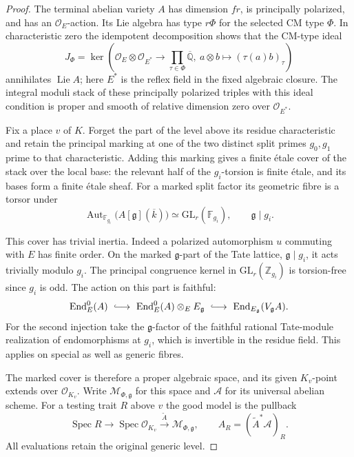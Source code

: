 \begin{proof}
The terminal abelian variety \(A\) has dimension \(fr\), is principally
polarized, and has an \(\mathcal O_E\)-action. Its Lie algebra has type
\(r\Phi\) for the selected CM type \(\Phi\). In characteristic zero
the idempotent decomposition shows that the CM-type ideal
\[
 J_\Phi=\ker\!\left(\mathcal O_E\otimes\mathcal O_{E^*}
    \longrightarrow \prod_{\tau\in\Phi}\overline{\mathbb Q},
              \ a\otimes b\longmapsto(\tau(a)b)_\tau\right)
\]
annihilates \(\operatorname{Lie}A\); here \(E^*\) is the reflex field
in the fixed algebraic closure. The integral moduli stack of these
principally polarized triples with this ideal condition is proper and
smooth of relative dimension zero over \(\mathcal O_{E^*}\).
\cite[Theorem~35]{amir-khosravi-serre}

Fix a place \(v\) of \(K\). Forget the part of the level above its residue
characteristic and retain the principal marking at one of the two
distinct split primes \(g_0,g_1\) prime to that characteristic.
Adding this marking gives a finite \'etale cover of the stack over the
local base: the relevant half of the \(g_i\)-torsion is finite \'etale,
and its bases form a finite \'etale sheaf. For a marked split factor its geometric fibre is a torsor under
\[
 \operatorname{Aut}_{\mathbb F_{g_i}}
     \bigl(A[\mathfrak g](\overline{k})\bigr)
           \simeq\mathrm{GL}_r(\mathbb F_{g_i}),\qquad \mathfrak g\mid g_i .
\]

This cover has trivial inertia. Indeed a polarized automorphism \(u\) commuting with \(E\) has finite
order. On the marked \(\mathfrak g\)-part of the Tate lattice,
\(\mathfrak g\mid g_i\), it acts trivially modulo \(g_i\).
The principal congruence kernel in \(\mathrm{GL}_r(\mathbb Z_{g_i})\)
is torsion-free since \(g_i\) is odd. The action on this part is faithful:
\[
 \operatorname{End}^0_{E}(A)\ \lhook\joinrel\longrightarrow\
 \operatorname{End}^0_{E}(A)\otimes_E E_{\mathfrak g}
 \ \lhook\joinrel\longrightarrow\
 \operatorname{End}_{E_{\mathfrak g}}(V_{\mathfrak g}A).
\]
For the second injection take the \(\mathfrak g\)-factor of the
faithful rational Tate-module realization of endomorphisms at
\(g_i\), which is invertible in the residue field.
This applies on special as well as generic fibres.

The marked cover is therefore a proper algebraic space, and its given
\(K_v\)-point extends over \(\mathcal O_{K_v}\). Write \(\mathcal M_{\Phi,\mathfrak g}\) for this space and \(\mathcal A\)
for its universal abelian scheme. For a testing trait \(R\) above \(v\)
the good model is the pullback
\[
  \operatorname{Spec} R\longrightarrow\operatorname{Spec}\mathcal O_{K_v}
      \xrightarrow{\,\widetilde A\,}\mathcal M_{\Phi,\mathfrak g},
    \qquad A_R=(\widetilde A^*\mathcal A)_R .
\]
All evaluations retain the original generic level.


\end{proof}
